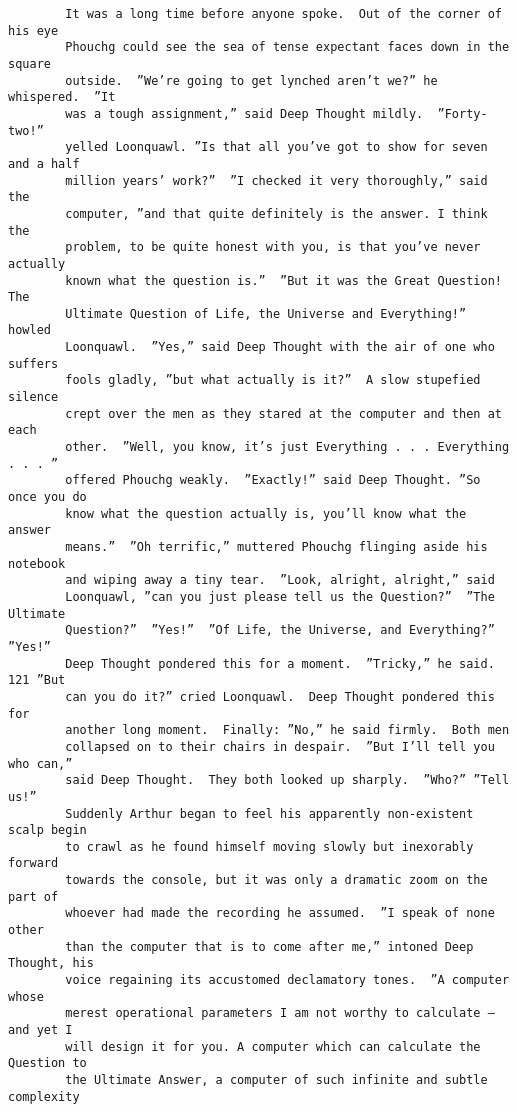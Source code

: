 \documentclass{article}
\begin{document}
    \begin{verbatim}
        It was a long time before anyone spoke.  Out of the corner of his eye
        Phouchg could see the sea of tense expectant faces down in the square
        outside.  ”We’re going to get lynched aren’t we?” he whispered.  ”It
        was a tough assignment,” said Deep Thought mildly.  ”Forty-two!”
        yelled Loonquawl. ”Is that all you’ve got to show for seven and a half
        million years’ work?”  ”I checked it very thoroughly,” said the
        computer, ”and that quite definitely is the answer. I think the
        problem, to be quite honest with you, is that you’ve never actually
        known what the question is.”  ”But it was the Great Question! The
        Ultimate Question of Life, the Universe and Everything!” howled
        Loonquawl.  ”Yes,” said Deep Thought with the air of one who suffers
        fools gladly, ”but what actually is it?”  A slow stupefied silence
        crept over the men as they stared at the computer and then at each
        other.  ”Well, you know, it’s just Everything . . . Everything . . . ”
        offered Phouchg weakly.  ”Exactly!” said Deep Thought. ”So once you do
        know what the question actually is, you’ll know what the answer
        means.”  ”Oh terrific,” muttered Phouchg flinging aside his notebook
        and wiping away a tiny tear.  ”Look, alright, alright,” said
        Loonquawl, ”can you just please tell us the Question?”  ”The Ultimate
        Question?”  ”Yes!”  ”Of Life, the Universe, and Everything?”  ”Yes!”
        Deep Thought pondered this for a moment.  ”Tricky,” he said.  121 ”But
        can you do it?” cried Loonquawl.  Deep Thought pondered this for
        another long moment.  Finally: ”No,” he said firmly.  Both men
        collapsed on to their chairs in despair.  ”But I’ll tell you who can,”
        said Deep Thought.  They both looked up sharply.  ”Who?” ”Tell us!”
        Suddenly Arthur began to feel his apparently non-existent scalp begin
        to crawl as he found himself moving slowly but inexorably forward
        towards the console, but it was only a dramatic zoom on the part of
        whoever had made the recording he assumed.  ”I speak of none other
        than the computer that is to come after me,” intoned Deep Thought, his
        voice regaining its accustomed declamatory tones.  ”A computer whose
        merest operational parameters I am not worthy to calculate – and yet I
        will design it for you. A computer which can calculate the Question to
        the Ultimate Answer, a computer of such infinite and subtle complexity

\end{verbatim}
\end{document}
